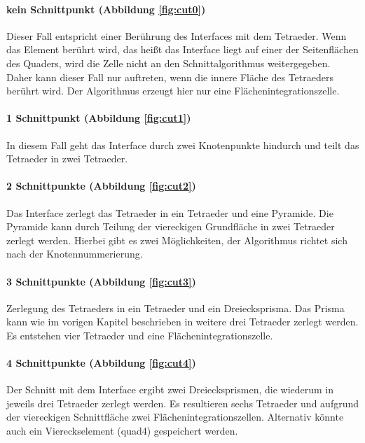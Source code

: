 \paragraph{kein Schnittpunkt (Abbildung \ref{fig:cut0})}
Dieser Fall entspricht einer Berührung des Interfaces mit dem Tetraeder. Wenn das Element berührt wird, das heißt das Interface liegt auf einer der Seitenflächen des Quaders, wird die Zelle nicht an den Schnittalgorithmus weitergegeben. Daher kann dieser Fall nur auftreten, wenn die innere Fläche des Tetraeders berührt wird. Der Algorithmus erzeugt hier nur eine Flächenintegrationszelle.

\paragraph{1 Schnittpunkt (Abbildung \ref{fig:cut1})}
In diesem Fall geht das Interface durch zwei Knotenpunkte hindurch und teilt das Tetraeder in zwei Tetraeder.

\paragraph{2 Schnittpunkte (Abbildung \ref{fig:cut2})}
Das Interface zerlegt das Tetraeder in ein Tetraeder und eine Pyramide. Die Pyramide kann durch Teilung der viereckigen Grundfläche in zwei Tetraeder zerlegt werden. Hierbei gibt es zwei Möglichkeiten, der Algorithmus richtet sich nach der Knotennummerierung.

\paragraph{3 Schnittpunkte (Abbildung \ref{fig:cut3})} 
Zerlegung des Tetraeders in ein Tetraeder und ein Dreiecksprisma. Das Prisma kann wie im vorigen Kapitel beschrieben in weitere drei Tetraeder zerlegt werden. Es entstehen vier Tetraeder und eine Flächenintegrationszelle.

\paragraph{4 Schnittpunkte (Abbildung \ref{fig:cut4})}
Der Schnitt mit dem Interface ergibt zwei Dreiecksprismen, die wiederum in jeweils drei Tetraeder zerlegt werden. Es resultieren sechs Tetraeder und aufgrund der viereckigen Schnittfläche zwei Flächenintegrationszellen. Alternativ könnte auch ein Viereckselement (quad4) gespeichert werden.



